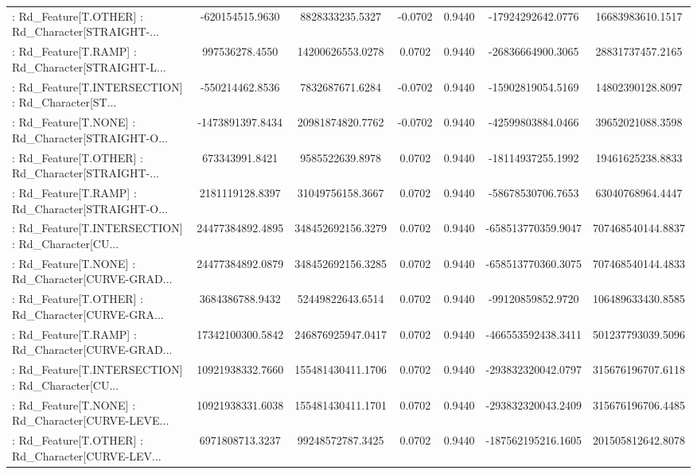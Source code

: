 \begin{longtable}{p{4cm}cccccc}
 : Rd\_Feature[T.OTHER] : Rd\_Character[STRAIGHT-... &   -620154515.9630 &   8828333235.5327 & -0.0702 &       0.9440 &  -17924292642.0776 &  16683983610.1517 \\
 : Rd\_Feature[T.RAMP] : Rd\_Character[STRAIGHT-L... &    997536278.4550 &  14200626553.0278 &  0.0702 &       0.9440 &  -26836664900.3065 &  28831737457.2165 \\
 : Rd\_Feature[T.INTERSECTION] : Rd\_Character[ST... &   -550214462.8536 &   7832687671.6284 & -0.0702 &       0.9440 &  -15902819054.5169 &  14802390128.8097 \\
 : Rd\_Feature[T.NONE] : Rd\_Character[STRAIGHT-O... &  -1473891397.8434 &  20981874820.7762 & -0.0702 &       0.9440 &  -42599803884.0466 &  39652021088.3598 \\
 : Rd\_Feature[T.OTHER] : Rd\_Character[STRAIGHT-... &    673343991.8421 &   9585522639.8978 &  0.0702 &       0.9440 &  -18114937255.1992 &  19461625238.8833 \\
 : Rd\_Feature[T.RAMP] : Rd\_Character[STRAIGHT-O... &   2181119128.8397 &  31049756158.3667 &  0.0702 &       0.9440 &  -58678530706.7653 &  63040768964.4447 \\
 : Rd\_Feature[T.INTERSECTION] : Rd\_Character[CU... &  24477384892.4895 & 348452692156.3279 &  0.0702 &       0.9440 & -658513770359.9047 & 707468540144.8837 \\
 : Rd\_Feature[T.NONE] : Rd\_Character[CURVE-GRAD... &  24477384892.0879 & 348452692156.3285 &  0.0702 &       0.9440 & -658513770360.3075 & 707468540144.4833 \\
 : Rd\_Feature[T.OTHER] : Rd\_Character[CURVE-GRA... &   3684386788.9432 &  52449822643.6514 &  0.0702 &       0.9440 &  -99120859852.9720 & 106489633430.8585 \\
 : Rd\_Feature[T.RAMP] : Rd\_Character[CURVE-GRAD... &  17342100300.5842 & 246876925947.0417 &  0.0702 &       0.9440 & -466553592438.3411 & 501237793039.5096 \\
 : Rd\_Feature[T.INTERSECTION] : Rd\_Character[CU... &  10921938332.7660 & 155481430411.1706 &  0.0702 &       0.9440 & -293832320042.0797 & 315676196707.6118 \\
 : Rd\_Feature[T.NONE] : Rd\_Character[CURVE-LEVE... &  10921938331.6038 & 155481430411.1701 &  0.0702 &       0.9440 & -293832320043.2409 & 315676196706.4485 \\
 : Rd\_Feature[T.OTHER] : Rd\_Character[CURVE-LEV... &   6971808713.3237 &  99248572787.3425 &  0.0702 &       0.9440 & -187562195216.1605 & 201505812642.8078 \\

\end{longtable}
